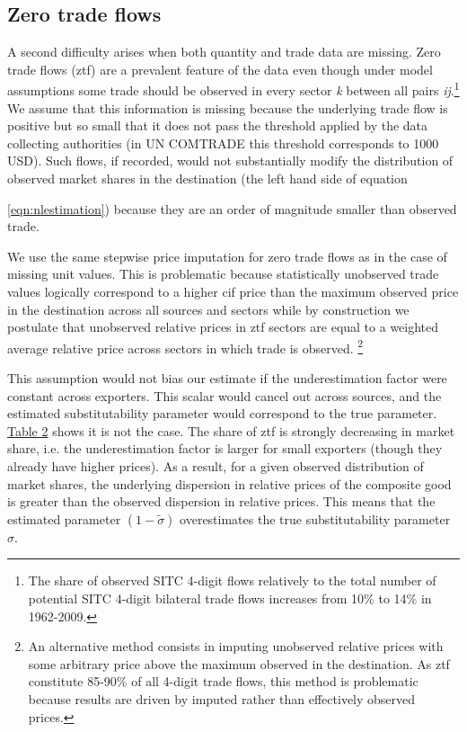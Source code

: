 \documentclass[12pt,twoside,a4paper,notitlepage]{article}
\begin{document}
\subsection{ Zero trade flows\label{mark-2.2.}}

A second difficulty arises when both quantity and trade data are missing.
Zero trade flows (ztf) are a prevalent feature of the data even though under model assumptions some trade should be observed in every sector \textit{k} between all pairs \textit{ij}.\footnote{The share of observed SITC 4-digit flows relatively to the total number of potential SITC 4-digit bilateral trade flows increases from 10\% to 14\% in 1962-2009.}
We assume that this information is missing because the underlying trade flow is positive but so small that it does not pass the threshold applied by the data collecting authorities (in UN COMTRADE this threshold corresponds to 1000 USD). Such flows, if recorded, would not substantially modify the distribution of observed market shares in the destination (the left hand side of equation {\ref{eqn:nlestimation}) because they are an order of magnitude smaller than observed trade.

We use the same stepwise price imputation for zero trade flows as in the case of missing unit values. This is problematic because statistically unobserved trade values logically correspond to a higher cif price than the maximum observed price in the destination across all sources and sectors while by construction we postulate that unobserved relative prices in ztf sectors are equal to a weighted average relative price across sectors in which trade is observed.
\footnote{An alternative method consists in imputing unobserved relative prices with some arbitrary price above the maximum observed in the destination. As ztf constitute 85-90\% of all 4-digit trade flows, this method is problematic because results are driven by imputed rather than effectively observed prices.
}

This assumption would not bias our estimate if the underestimation factor were constant across exporters. This scalar would cancel out across sources, and the estimated substitutability parameter would correspond to the true parameter. {\hyperref[ref-005]{Table 2}} shows it is not the case. The share of ztf is strongly decreasing in market share, i.e. the underestimation factor is larger for small exporters (though they already have higher prices). As a result, for a given observed distribution of market shares, the underlying dispersion in relative prices of the composite good is greater than the observed dispersion in relative prices. This means that the estimated parameter $(1-\tilde{\sigma })$ overestimates the true substitutability parameter $\sigma$.

}
\end{document}
